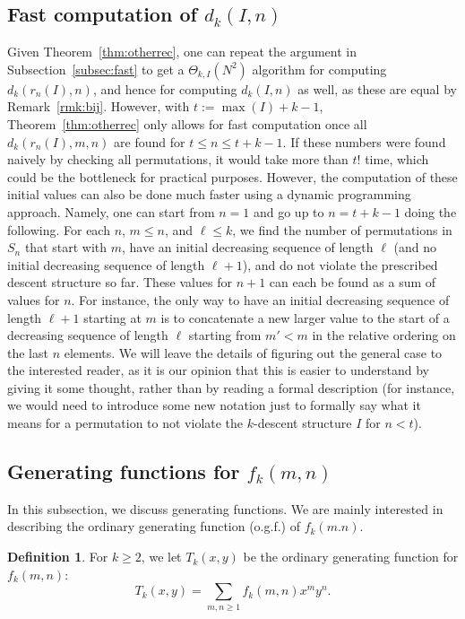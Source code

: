 \documentclass{amsart}
\theoremstyle{definition}
\newtheorem{definition}[theorem]{Definition}
\begin{document}
\subsection{Fast computation of $d_k(I,n)$}\label{subsec:genfast}
Given Theorem~\ref{thm:otherrec}, one can repeat the argument in Subsection~\ref{subsec:fast} to get a $\Theta_{k,I}(N^2)$ algorithm for computing $d_k(r_n(I),n)$, and hence for computing $d_k(I,n)$ as well, as these are equal by Remark~\ref{rmk:bij}. However, with $t:=\max(I)+k-1$, Theorem~\ref{thm:otherrec} only allows for fast computation once all $d_k(r_n(I),m,n)$ are found for $t\leq n\leq t+k-1$. If these numbers were found naively by checking all permutations, it would take more than $t!$ time, which could be the bottleneck for practical purposes. However, the computation of these initial values can also be done much faster using a dynamic programming approach. Namely, one can start from $n=1$ and go up to $n=t+k-1$ doing the following. For each $n$, $m\leq n$, and $\ell\leq k$, we find the number of permutations in $S_n$ that start with $m$, have an initial decreasing sequence of length $\ell$ (and no initial decreasing sequence of length $\ell+1$), and do not violate the prescribed descent structure so far. These values for $n+1$ can each be found as a sum of values for $n$. For instance, the only way to have an initial decreasing sequence of length $\ell+1$ starting at $m$ is to concatenate a new larger value to the start of a decreasing sequence of length $\ell$ starting from $m'<m$ in the relative ordering on the last $n$ elements.  We will leave the details of figuring out the general case to the interested reader, as it is our opinion that this is easier to understand by giving it some thought, rather than by reading a formal description (for instance, we would need to introduce some new notation just to formally say what it means for a permutation to not violate the $k$-descent structure $I$ for $n<t$).



\subsection{Generating functions for $f_k(m,n)$}\label{subsec:generating}
In this subsection, we discuss generating functions. We are mainly interested in describing the ordinary generating function (o.g.f.) of $f_k(m.n)$.
\begin{definition}
For $k\geq 2$, we let $T_k(x,y)$ be the ordinary generating function for $f_k(m,n)$:
\[T_k(x,y)=\sum_{m,n\geq 1}f_k(m,n)x^m y^n.\]
\end{definition}
\end{document}
